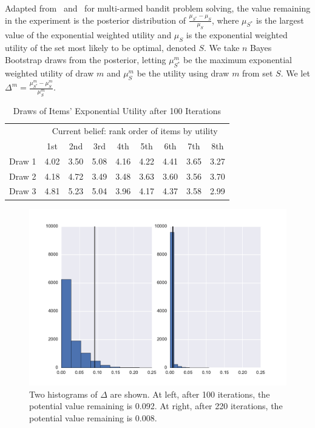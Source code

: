 \documentclass[nonblindrev]{informs3}
\begin{document}
Adapted from~\cite{scott2015multi} and~\cite{scott2010modern} for multi-armed bandit problem solving, the value remaining in the experiment is the posterior distribution of $\frac{\mu_{S^*}-\mu_{S}}{\mu_{S}}$, where $\mu_{S^*}$ is the largest value of the exponential weighted utility and $\mu_{S}$ is the exponential weighted utility of the set most likely to be optimal, denoted $S$. We take $n$ Bayes Bootstrap draws from the posterior, letting $\mu_{S^*}^{m}$ be the maximum exponential weighted utility of draw $m$ and $\mu_{S}^{m}$ be the utility using draw $m$ from set $S$. We let $\Delta^{m}=\frac{\mu^m_{S^*}-\mu^m_{S}}{\mu^m_{S}}$.

\begin{table}
\begin{center}
\caption{Draws of Items' Exponential Utility after 100 Iterations}
\label{table:data}
\begin{tabular}{l | c c c c c c c c}
& \multicolumn{8}{c}{Current belief: rank order of items by utility} \\
& 1st &  2nd  &  3rd  &  4th &  5th & 6th & 7th &  8th \\
\hline
Draw 1 & 4.02 &  3.50 &  5.08 & 4.16&  4.22 & 4.41 & 3.65 &  3.27 \\
Draw 2 &4.18 & 4.72 & 3.49 & 3.48 & 3.63 & 3.60 & 3.56 &  3.70 \\
Draw 3 &4.81 & 5.23 & 5.04 &  3.96 &  4.17 & 4.37 &  3.58 & 2.99 \\ 
\end{tabular}
\end{center}
\end{table}

\begin{figure}
\includegraphics[width=1\linewidth]{plots/valremhist.pdf}
\caption{Two histograms of $\Delta$ are shown. At left, after 100 iterations, the potential value remaining is 0.092. At right, after 220 iterations, the potential value remaining is 0.008.}
\label{fig:data}
\end{figure}
\end{document}
